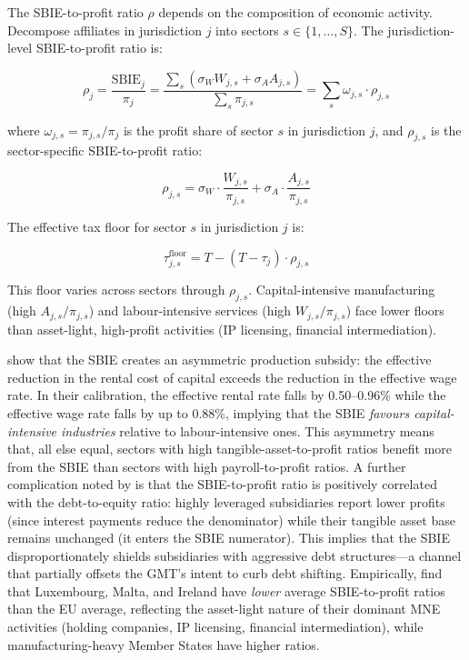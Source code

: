 \documentclass[11pt,a4paper]{article}
\begin{document}
The SBIE-to-profit ratio $\rho$ depends on the composition of economic activity. Decompose affiliates in jurisdiction $j$ into sectors $s \in \{1, \ldots, S\}$. The jurisdiction-level SBIE-to-profit ratio is:

\begin{equation}\label{eq:rho_sectoral}
\rho_j = \frac{\text{SBIE}_j}{\pi_j} = \frac{\sum_s \left(\sigma_W W_{j,s} + \sigma_A A_{j,s}\right)}{\sum_s \pi_{j,s}} = \sum_s \omega_{j,s} \cdot \rho_{j,s}
\end{equation}

where $\omega_{j,s} = \pi_{j,s} / \pi_j$ is the profit share of sector $s$ in jurisdiction $j$, and $\rho_{j,s}$ is the sector-specific SBIE-to-profit ratio:

\begin{equation}\label{eq:rho_sector}
\rho_{j,s} = \sigma_W \cdot \frac{W_{j,s}}{\pi_{j,s}} + \sigma_A \cdot \frac{A_{j,s}}{\pi_{j,s}}
\end{equation}

The effective tax floor for sector $s$ in jurisdiction $j$ is:

\begin{equation}\label{eq:floor_sector}
\tau_{j,s}^{\text{floor}} = T - (T - \tau_j) \cdot \rho_{j,s}
\end{equation}

This floor varies across sectors through $\rho_{j,s}$. Capital-intensive manufacturing (high $A_{j,s}/\pi_{j,s}$) and labour-intensive services (high $W_{j,s}/\pi_{j,s}$) face lower floors than asset-light, high-profit activities (IP licensing, financial intermediation).

\citet{schjelderup2024} show that the SBIE creates an asymmetric production subsidy: the effective reduction in the rental cost of capital exceeds the reduction in the effective wage rate. In their calibration, the effective rental rate falls by 0.50--0.96\% while the effective wage rate falls by up to 0.88\%, implying that the SBIE \emph{favours capital-intensive industries} relative to labour-intensive ones. This asymmetry means that, all else equal, sectors with high tangible-asset-to-profit ratios benefit more from the SBIE than sectors with high payroll-to-profit ratios. A further complication noted by \citet{devereux2023} is that the SBIE-to-profit ratio is positively correlated with the debt-to-equity ratio: highly leveraged subsidiaries report lower profits (since interest payments reduce the denominator) while their tangible asset base remains unchanged (it enters the SBIE numerator). This implies that the SBIE disproportionately shields subsidiaries with aggressive debt structures---a channel that partially offsets the GMT's intent to curb debt shifting. Empirically, \citet{devereux2023} find that Luxembourg, Malta, and Ireland have \emph{lower} average SBIE-to-profit ratios than the EU average, reflecting the asset-light nature of their dominant MNE activities (holding companies, IP licensing, financial intermediation), while manufacturing-heavy Member States have higher ratios.
\end{document}
